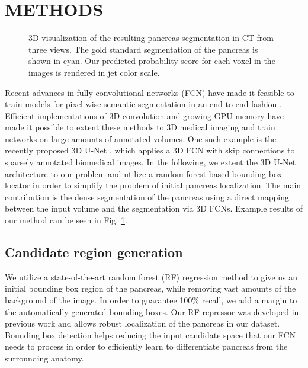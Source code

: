 \documentclass[a4paper]{spie}  %
\begin{document}
\section{METHODS}
\begin{figure}[tb]
  \centering
  \vspace{1em}
\caption{ 3D visualization of the resulting pancreas segmentation in CT from three views. The gold standard segmentation of the pancreas is shown in cyan. Our predicted probability score for each voxel in the images is rendered in jet color scale. \label{fig:result_3D_view}}
\end{figure}
Recent advances in fully convolutional networks (FCN) have made it feasible to train models for pixel-wise semantic segmentation in an end-to-end fashion \cite{long2015fully}. Efficient implementations of 3D convolution and growing GPU memory have made it possible to extent these methods to 3D medical imaging and train networks on large amounts of annotated volumes. One such example is the recently proposed 3D U-Net \cite{cciccek20163d}, which applies a 3D FCN with skip connections to sparsely annotated biomedical images. In the following, we extent the 3D U-Net architecture to our problem and utilize a random forest based bounding box locator in order to simplify the problem of initial pancreas localization. The main contribution is the dense segmentation of the pancreas using a direct mapping between the input volume and the segmentation via 3D FCNs. Example results of our method can be seen in Fig. \ref{fig:result_3D_view}. 

\subsection{Candidate region generation} We utilize a state-of-the-art random forest (RF) regression method to give us an initial bounding box region of the pancreas, while removing vast amounts of the background of the image. In order to guarantee 100\% recall, we add a margin to the automatically generated bounding boxes. Our RF repressor was developed in previous work \cite{oda2016regression} and allows robust localization of the pancreas in our dataset. Bounding box detection helps reducing the input candidate space that our FCN needs to process in order to efficiently learn to differentiate pancreas from the surrounding anatomy.
\end{document}
